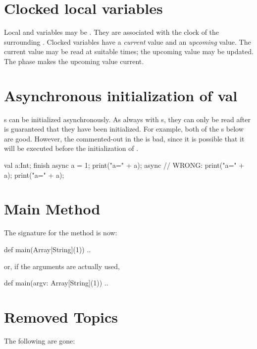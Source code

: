 \section{Clocked local variables}

Local  and  variables may be .  They are
associated with the clock of the surrounding .  
Clocked variables have a {\em current} value and an {\em upcoming} value.  The
current value may be read at suitable times; the upcoming value may be
updated.  The  phase makes the upcoming value current.

\section{Asynchronous initialization of val}

s can be initialized asynchronously.   As always with s,
they can only be read after is guaranteed that they have been initialized.
For example, both of the s below are good.  However, the
commented-out  in the  is bad, since it is possible that
it will be executed before the initialization of . 
\begin{xten}
val a:Int;
finish {
  async {
     a = 1; 
     print("a=" + a);
  }
  async {
     // WRONG: print("a=" + a);
  }
}
print("a=" + a);
\end{xten}



\section{Main Method}

The signature for the  method is now: 
\begin{xten}
           def main(Array[String](1)) {..}
\end{xten}
or, if the arguments are actually used, 
\begin{xten}
           def main(argv: Array[String](1)) {..}
\end{xten}

\section{Removed Topics}

The following are gone: 

